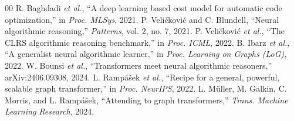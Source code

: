 \documentclass[conference]{IEEEtran}
\begin{document}
\begin{thebibliography}{00}
 R. Baghdadi \emph{et al.}, ``A deep learning based cost model for automatic code optimization,'' in \emph{Proc. MLSys}, 2021.
 P. Veli\v{c}kovi\'c and C. Blundell, ``Neural algorithmic reasoning,'' \emph{Patterns}, vol. 2, no. 7, 2021.
 P. Veli\v{c}kovi\'c \emph{et al.}, ``The CLRS algorithmic reasoning benchmark,'' in \emph{Proc. ICML}, 2022.
 B. Ibarz \emph{et al.}, ``A generalist neural algorithmic learner,'' in \emph{Proc. Learning on Graphs (LoG)}, 2022.
 W. Bounsi \emph{et al.}, ``Transformers meet neural algorithmic reasoners,'' arXiv:2406.09308, 2024.
 L. Ramp\'a\v{s}ek \emph{et al.}, ``Recipe for a general, powerful, scalable graph transformer,'' in \emph{Proc. NeurIPS}, 2022.
 L. M\"uller, M. Galkin, C. Morris, and L. Ramp\'a\v{s}ek, ``Attending to graph transformers,'' \emph{Trans. Machine Learning Research}, 2024.
\end{thebibliography}
\end{document}
